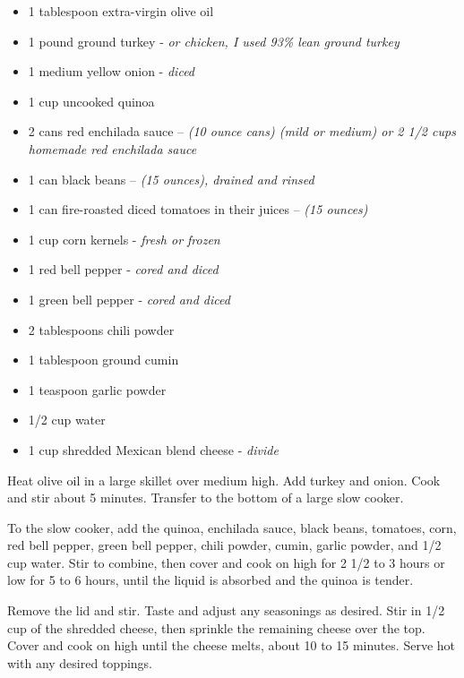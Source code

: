
\ingredients
\begin{itemize}
\item
  1 tablespoon extra-virgin olive oil
\item
  1 pound ground turkey - \emph{or chicken, I used 93\% lean ground
  turkey}
\item
  1 medium yellow onion - \emph{diced}
\item
  1 cup uncooked quinoa
\item
  2 cans red enchilada sauce -- \emph{(10 ounce cans) (mild or medium) or 2 1/2 cups homemade red enchilada sauce}
\item
  1 can black beans -- \emph{(15 ounces), drained and rinsed}
\item
  1 can fire-roasted diced tomatoes in
  their juices -- \emph{(15 ounces)}
\item
  1 cup corn kernels - \emph{fresh or frozen}
\item
  1 red bell pepper - \emph{cored and diced}
\item
  1 green bell pepper - \emph{cored and diced}
\item
  2 tablespoons chili powder
\item
  1 tablespoon ground cumin
\item
  1 teaspoon garlic powder
\item
  1/2 cup water
\item
  1 cup shredded Mexican blend cheese - \emph{divide}
\end{itemize}

\instructions
Heat olive oil in a large skillet over medium high. Add turkey and
onion. Cook and stir about 5 minutes. Transfer to the bottom of a
large slow cooker.

To the slow cooker, add the quinoa, enchilada sauce, black beans,
tomatoes, corn, red bell pepper, green bell pepper, chili powder, cumin,
garlic powder, and 1/2 cup water. Stir to combine, then cover and cook
on high for 2 1/2 to 3 hours or low for 5 to 6 hours, until the liquid
is absorbed and the quinoa is tender.

Remove the lid and stir. Taste and adjust any seasonings as desired.
Stir in 1/2 cup of the shredded cheese, then sprinkle the remaining
cheese over the top. Cover and cook on high until the cheese melts,
about 10 to 15 minutes. Serve hot with any desired toppings.

